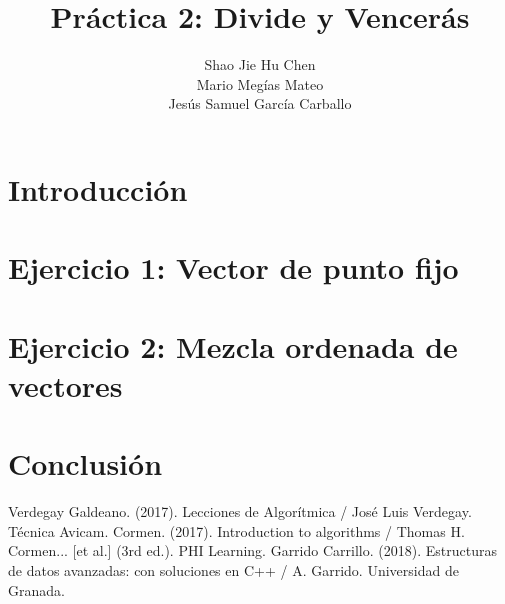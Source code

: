 \documentclass{homework}
\title{Práctica 2: Divide y Vencerás}
\author{Shao Jie Hu Chen \\ Mario Megías Mateo \\ Jesús Samuel García Carballo}
\begin{document}
    \maketitle
    \tableofcontents
    \newpage

    \section{Introducción}
    
    \newpage

    \section{Ejercicio 1: Vector de punto fijo}
    
    \newpage
    
    \section{Ejercicio 2: Mezcla ordenada de vectores}
    
    \newpage

    \section{Conclusión}
    
    \newpage

    \newpage
    \begin{thebibliography}{0}
         Verdegay Galdeano. (2017). Lecciones de Algorítmica / José Luis Verdegay. Técnica Avicam.
         Cormen. (2017). Introduction to algorithms / Thomas H. Cormen... [et al.] (3rd ed.). PHI Learning.
         Garrido Carrillo. (2018). Estructuras de datos avanzadas: con soluciones en C++ / A. Garrido. Universidad de Granada.        
    \end{thebibliography}
\end{document}
